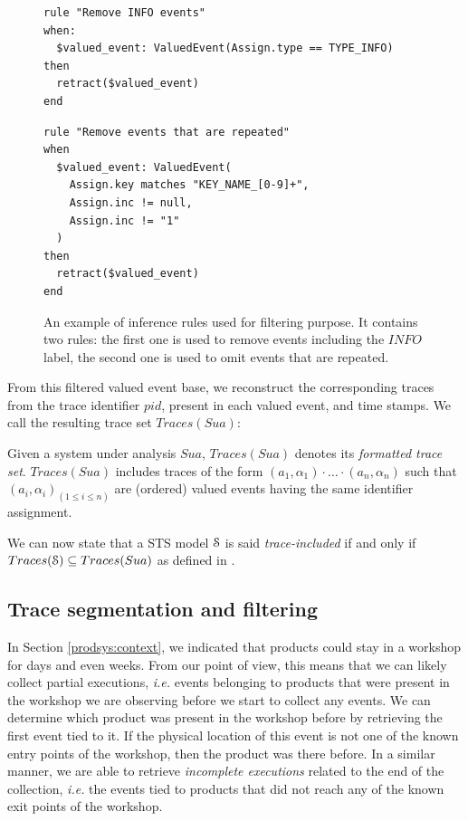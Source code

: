 \begin{figure}[ht]
\begin{framed}
\begin{BVerbatim}
rule "Remove INFO events"
when:
  $valued_event: ValuedEvent(Assign.type == TYPE_INFO)
then
  retract($valued_event)
end
\end{BVerbatim}
\end{framed}

\begin{framed}
\begin{BVerbatim}
rule "Remove events that are repeated"
when
  $valued_event: ValuedEvent(
    Assign.key matches "KEY_NAME_[0-9]+",
    Assign.inc != null,
    Assign.inc != "1"
  )
then
  retract($valued_event)
end
\end{BVerbatim}
\end{framed}

\caption{An example of inference rules used for filtering
purpose. It contains two rules: the first one is used to remove
events including the $INFO$ label, the second one is used to omit
events that are repeated.}
\label{fig:removalrules}
\end{figure}

From this filtered valued event base, we reconstruct the
corresponding traces from the trace identifier $pid$, present in
each valued event, and time stamps. We call the resulting trace
set $Traces(Sua)$:

\begin{definition}
    Given a system under analysis $\mathit{Sua}$, $Traces(Sua)$
    denotes its \emph{formatted trace set}. $Traces(Sua)$
    includes traces of the form $(a_1,\alpha_1) \cdot \dots \cdot
    (a_n,\alpha_n)$ such that $(a_i,\alpha_i)_{(1 \leq i \leq
    n)}$ are (ordered) valued events having the same identifier
    assignment.

	\label{def:structuredtrace}
\end{definition}

We can now state that a STS model $\EuScript{S}$ is said
\emph{trace-included} if and only if $Traces(\EuScript{S})
\subseteq Traces(Sua)$ as defined in \cite{petrenko06}.

\subsection{Trace segmentation and filtering}
\label{sec:modelinf:prodsystems:segmentation}

In Section \ref{prodsys:context}, we indicated that products
could stay in a workshop for days and even weeks. From our point
of view, this means that we can likely collect partial
executions, \emph{i.e.} events belonging to products that were present
in the workshop we are observing before we start to collect any
events. We can determine which product was present in the
workshop before by retrieving the first event tied to it.
If the physical location of this event is not one of the known
entry points of the workshop, then the product was there before.
In a similar manner, we are able to retrieve \emph{incomplete
executions} related to the end of the collection, \emph{i.e.} the
events tied to products that did not reach any of the known exit
points of the workshop.


